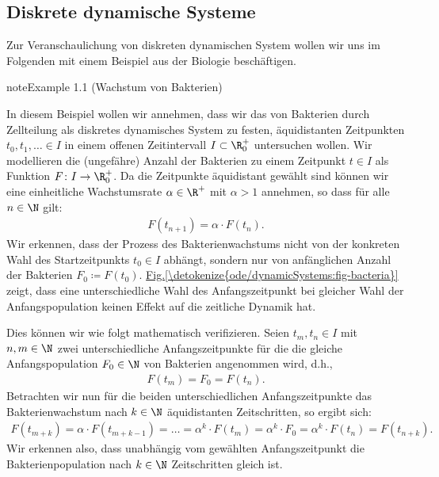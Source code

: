 \documentclass[letterpaper,10pt,english]{jupyterBook}
\begin{document}
\subsection{Diskrete dynamische Systeme}
\label{\detokenize{ode/dynamicSystems:diskrete-dynamische-systeme}}
\sphinxAtStartPar
Zur Veranschaulichung von diskreten dynamischen System wollen wir uns im Folgenden mit einem Beispiel aus der Biologie beschäftigen.
\label{ode/dynamicSystems:ex:bacteria}
\begin{sphinxadmonition}{note}{Example 1.1 (Wachstum von Bakterien)}



\sphinxAtStartPar
In diesem Beispiel wollen wir annehmen, dass wir das  von Bakterien durch Zellteilung als diskretes dynamisches System zu festen, äquidistanten Zeitpunkten \(t_0, t_1, \ldots \in I\) in einem offenen Zeitintervall \(I\subset\R^+_0\) untersuchen wollen.
Wir modellieren die (ungefähre) Anzahl der Bakterien zu einem Zeitpunkt \(t \in I\) als Funktion \(F \colon I \rightarrow \R_0^+\).
Da die Zeitpunkte äquidistant gewählt sind können wir eine einheitliche Wachstumsrate \(\alpha \in \R^+\) mit \(\alpha > 1\) annehmen, so dass für alle \(n \in \N\) gilt:
\begin{equation*}
\begin{split}F(t_{n+1}) = \alpha \cdot F(t_n).\end{split}
\end{equation*}
\sphinxAtStartPar
Wir erkennen, dass der Prozess des Bakterienwachstums nicht von der konkreten Wahl des Startzeitpunkts \(t_0 \in I\) abhängt, sondern nur von anfänglichen Anzahl der Bakterien \(F_0 \coloneqq F(t_0)\). \hyperref[\detokenize{ode/dynamicSystems:fig-bacteria}]{Fig.\@ \ref{\detokenize{ode/dynamicSystems:fig-bacteria}}} zeigt, dass eine unterschiedliche Wahl des Anfangszeitpunkt bei gleicher Wahl der Anfangspopulation keinen Effekt auf die zeitliche Dynamik hat.

\sphinxAtStartPar
Dies können wir wie folgt mathematisch verifizieren. Seien \(t_m, t_n \in I\) mit \(n,m \in \N\) zwei unterschiedliche Anfangszeitpunkte für die die gleiche Anfangspopulation \(F_0 \in \N\) von Bakterien angenommen wird, d.h.,
\begin{equation*}
\begin{split}F(t_m) = F_0 = F(t_n).\end{split}
\end{equation*}
\sphinxAtStartPar
Betrachten wir nun für die beiden unterschiedlichen Anfangszeitpunkte das Bakterienwachstum nach \(k \in \N\) äquidistanten Zeitschritten, so ergibt sich:
\begin{equation*}
\begin{split}F(t_{m+k}) = \alpha \cdot F(t_{m+k-1}) = \ldots = \alpha^k \cdot F(t_{m}) = \alpha^k \cdot F_0 = \alpha^k \cdot F(t_n) = F(t_{n+k}).\end{split}
\end{equation*}
\sphinxAtStartPar
Wir erkennen also, dass unabhängig vom gewählten Anfangszeitpunkt die Bakterienpopulation nach \(k \in \N\) Zeitschritten gleich ist.
\end{sphinxadmonition}
\end{document}
